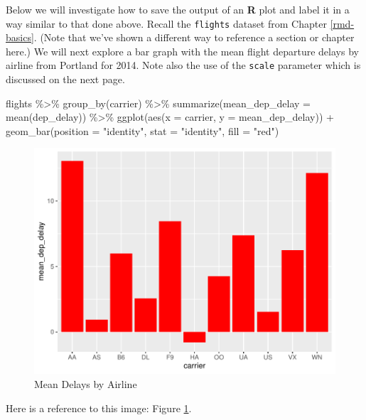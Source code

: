 \documentclass [11pt, proquest] {uwthesis}[2015/03/03]
\newenvironment{Shaded}{\begin{snugshade}}{\end{snugshade}}
\newcommand{\AttributeTok}[1]{\textcolor[rgb]{0.77,0.63,0.00}{#1}}
\newcommand{\FunctionTok}[1]{\textcolor[rgb]{0.00,0.00,0.00}{#1}}
\newcommand{\NormalTok}[1]{#1}
\newcommand{\SpecialCharTok}[1]{\textcolor[rgb]{0.00,0.00,0.00}{#1}}
\newcommand{\StringTok}[1]{\textcolor[rgb]{0.31,0.60,0.02}{#1}}
\begin{document}
\clearpage

Below we will investigate how to save the output of an \textbf{R} plot and label it in a way similar to that done above. Recall the \texttt{flights} dataset from Chapter \ref{rmd-basics}. (Note that we've shown a different way to reference a section or chapter here.) We will next explore a bar graph with the mean flight departure delays by airline from Portland for 2014. Note also the use of the \texttt{scale} parameter which is discussed on the next page.
\begin{Shaded}
\begin{Highlighting}[]
\NormalTok{flights }\SpecialCharTok{\%\textgreater{}\%} \FunctionTok{group\_by}\NormalTok{(carrier) }\SpecialCharTok{\%\textgreater{}\%}
  \FunctionTok{summarize}\NormalTok{(}\AttributeTok{mean\_dep\_delay =} \FunctionTok{mean}\NormalTok{(dep\_delay)) }\SpecialCharTok{\%\textgreater{}\%}
  \FunctionTok{ggplot}\NormalTok{(}\FunctionTok{aes}\NormalTok{(}\AttributeTok{x =}\NormalTok{ carrier, }\AttributeTok{y =}\NormalTok{ mean\_dep\_delay)) }\SpecialCharTok{+}
  \FunctionTok{geom\_bar}\NormalTok{(}\AttributeTok{position =} \StringTok{"identity"}\NormalTok{, }\AttributeTok{stat =} \StringTok{"identity"}\NormalTok{, }\AttributeTok{fill =} \StringTok{"red"}\NormalTok{)}
\end{Highlighting}
\end{Shaded}
\begin{figure}
\centering
\includegraphics{thesis_files/figure-latex/delaysboxplot-1.pdf}
\caption{\label{fig:delaysboxplot}Mean Delays by Airline}
\end{figure}
Here is a reference to this image: Figure \ref{fig:delaysboxplot}.
\end{document}
